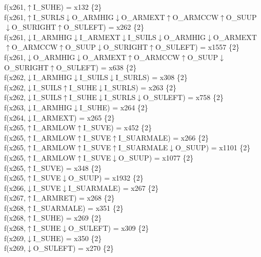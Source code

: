 f(x261,$\uparrow$I\_SUHE) = x132 \{2\} \\  
f(x261,$\uparrow$I\_SURLS$\downarrow$O\_ARMHIG$\downarrow$O\_ARMEXT$\uparrow$O\_ARMCCW$\uparrow$O\_SUUP$\downarrow$O\_SURIGHT$\uparrow$O\_SULEFT) = x262 \{2\} \\  
f(x261,$\downarrow$I\_ARMHIG$\downarrow$I\_ARMEXT$\downarrow$I\_SUILS$\downarrow$O\_ARMHIG$\downarrow$O\_ARMEXT$\uparrow$O\_ARMCCW$\uparrow$O\_SUUP$\downarrow$O\_SURIGHT$\uparrow$O\_SULEFT) = x1557 \{2\} \\  
f(x261,$\downarrow$O\_ARMHIG$\downarrow$O\_ARMEXT$\uparrow$O\_ARMCCW$\uparrow$O\_SUUP$\downarrow$O\_SURIGHT$\uparrow$O\_SULEFT) = x638 \{2\} \\  
f(x262,$\downarrow$I\_ARMHIG$\downarrow$I\_SUILS$\downarrow$I\_SURLS) = x308 \{2\} \\  
f(x262,$\downarrow$I\_SUILS$\uparrow$I\_SUHE$\downarrow$I\_SURLS) = x263 \{2\} \\  
f(x262,$\downarrow$I\_SUILS$\uparrow$I\_SUHE$\downarrow$I\_SURLS$\downarrow$O\_SULEFT) = x758 \{2\} \\  
f(x263,$\downarrow$I\_ARMHIG$\downarrow$I\_SUHE) = x264 \{2\} \\  
f(x264,$\downarrow$I\_ARMEXT) = x265 \{2\} \\  
f(x265,$\uparrow$I\_ARMLOW$\uparrow$I\_SUVE) = x452 \{2\} \\  
f(x265,$\uparrow$I\_ARMLOW$\uparrow$I\_SUVE$\uparrow$I\_SUARMALE) = x266 \{2\} \\  
f(x265,$\uparrow$I\_ARMLOW$\uparrow$I\_SUVE$\uparrow$I\_SUARMALE$\downarrow$O\_SUUP) = x1101 \{2\} \\  
f(x265,$\uparrow$I\_ARMLOW$\uparrow$I\_SUVE$\downarrow$O\_SUUP) = x1077 \{2\} \\  
f(x265,$\uparrow$I\_SUVE) = x348 \{2\} \\  
f(x265,$\uparrow$I\_SUVE$\downarrow$O\_SUUP) = x1932 \{2\} \\  
f(x266,$\downarrow$I\_SUVE$\downarrow$I\_SUARMALE) = x267 \{2\} \\  
f(x267,$\uparrow$I\_ARMRET) = x268 \{2\} \\  
f(x268,$\uparrow$I\_SUARMALE) = x351 \{2\} \\  
f(x268,$\uparrow$I\_SUHE) = x269 \{2\} \\  
f(x268,$\uparrow$I\_SUHE$\downarrow$O\_SULEFT) = x309 \{2\} \\  
f(x269,$\downarrow$I\_SUHE) = x350 \{2\} \\  
f(x269,$\downarrow$O\_SULEFT) = x270 \{2\} \\  
